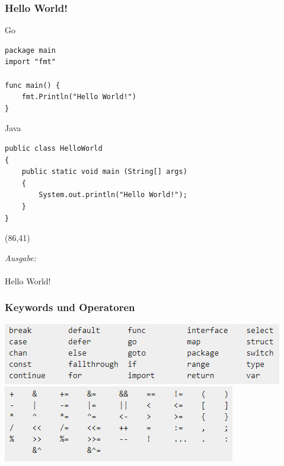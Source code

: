\documentclass{beamer}
\begin{document}
\begin{frame}[fragile]
\frametitle{Hello World!}

Go
\begin{lstlisting}
package main
import "fmt"

func main() {
    fmt.Println("Hello World!")
}
\end{lstlisting}

Java
\lstset{language=Java}%
\begin{lstlisting}
public class HelloWorld 
{ 
    public static void main (String[] args)
    {
        System.out.println("Hello World!");
    }
}
\end{lstlisting}

\begin{textblock}{32}(86,41)
\begin{tcolorbox}
\textit{Ausgabe:\\}\\
Hello World!
\end{tcolorbox}
\end{textblock}

\end{frame}


\begin{frame}[fragile]
\frametitle{Keywords und Operatoren}

\includegraphics[scale=0.9]{keywords.png}\\
\includegraphics[scale=0.9]{operators.png}

\end{frame}

\end{document}
